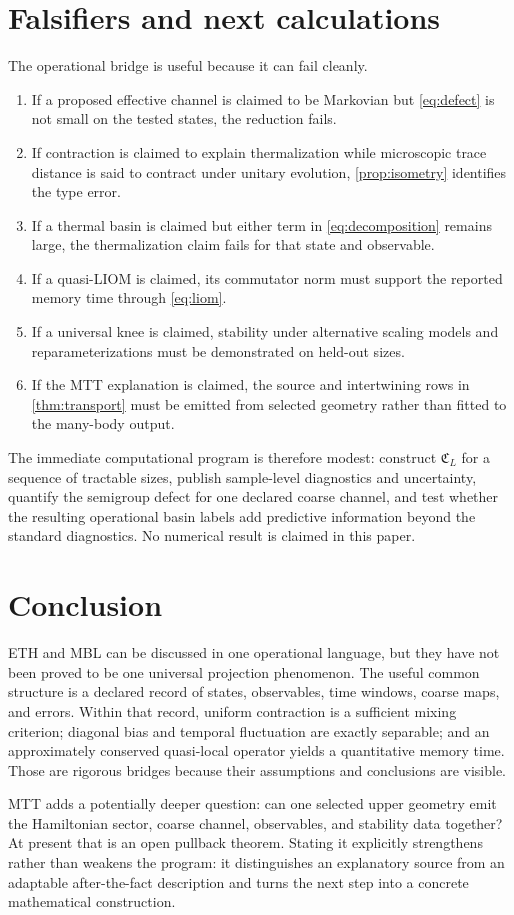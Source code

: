 \documentclass[11pt]{article}
\begin{document}
\section{Falsifiers and next calculations}

The operational bridge is useful because it can fail cleanly.
\begin{enumerate}
\item If a proposed effective channel is claimed to be Markovian but
\cref{eq:defect} is not small on the tested states, the reduction fails.
\item If contraction is claimed to explain thermalization while
microscopic trace distance is said to contract under unitary evolution,
\cref{prop:isometry} identifies the type error.
\item If a thermal basin is claimed but either term in
\cref{eq:decomposition} remains large, the thermalization claim fails for
that state and observable.
\item If a quasi-LIOM is claimed, its commutator norm must support the
reported memory time through \cref{eq:liom}.
\item If a universal knee is claimed, stability under alternative scaling
models and reparameterizations must be demonstrated on held-out sizes.
\item If the MTT explanation is claimed, the source and intertwining rows
in \cref{thm:transport} must be emitted from selected geometry rather
than fitted to the many-body output.
\end{enumerate}

The immediate computational program is therefore modest: construct
$\mathfrak C_L$ for a sequence of tractable sizes, publish sample-level
diagnostics and uncertainty, quantify the semigroup defect for one
declared coarse channel, and test whether the resulting operational
basin labels add predictive information beyond the standard diagnostics.
No numerical result is claimed in this paper.

\section{Conclusion}

ETH and MBL can be discussed in one operational language, but they have
not been proved to be one universal projection phenomenon.  The useful
common structure is a declared record of states, observables, time
windows, coarse maps, and errors.  Within that record, uniform
contraction is a sufficient mixing criterion; diagonal bias and temporal
fluctuation are exactly separable; and an approximately conserved
quasi-local operator yields a quantitative memory time.  Those are
rigorous bridges because their assumptions and conclusions are visible.

MTT adds a potentially deeper question: can one selected upper geometry
emit the Hamiltonian sector, coarse channel, observables, and stability
data together?  At present that is an open pullback theorem.  Stating it
explicitly strengthens rather than weakens the program: it distinguishes
an explanatory source from an adaptable after-the-fact description and
turns the next step into a concrete mathematical construction.



\end{document}
